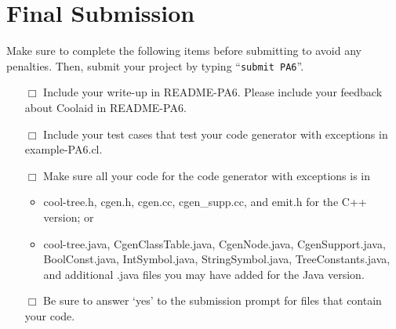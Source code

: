 \documentclass[11pt]{article}
\def\U#1{{\sf{}#1}}
\def\S#1{{\tt{}#1}} %
\newcommand{\Coolaid}{\U{Coolaid}}
\begin{document}
\newpage
\section{Final Submission}

Make sure to complete the following items before submitting to avoid
any penalties.  Then, submit your project by typing ``\S{submit
PA6}''.

\begin{minipage}{0.8\linewidth}
\bigskip
\begin{itemize}
  \item[$\Box$]
    Include your write-up in \U{README-PA6}.  Please include your
    feedback about \Coolaid{} in \U{README-PA6}.

  \item[$\Box$]
    Include your test cases that test your code generator with
    exceptions in \U{example-PA6.cl}.

  \item[$\Box$]
    Make sure all your code for the code generator with exceptions
    is in
    \begin{itemize}
    \item \U{cool-tree.h}, \U{cgen.h},
          \U{cgen.cc}, \U{cgen\_supp.cc}, and \U{emit.h} for the
          C++ version; or
    \item \U{cool-tree.java}, \U{CgenClassTable.java},
          \U{CgenNode.java}, \U{CgenSupport.java}, \U{BoolConst.java},
          \U{IntSymbol.java}, \U{StringSymbol.java},
          \U{TreeConstants.java}, and additional \U{.java} files you
          may have added for the Java version.
    \end{itemize}

  \item[$\Box$]
    Be sure to answer `yes' to the submission prompt for files that contain
    your code.
\end{itemize}
\end{minipage}
\end{document}
